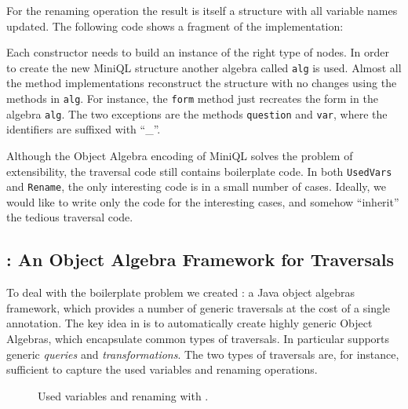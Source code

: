 For the renaming operation the result is itself a structure
with all variable names updated. The following code shows a fragment of the
implementation:


Each
constructor needs to build an instance of the right type of nodes.
In order to create the new
MiniQL structure another algebra called \lstinline{alg} is used.
Almost all the method implementations reconstruct the structure with
no changes using the methods in \lstinline{alg}. For instance, the \lstinline{form} method just recreates the form in the algebra \lstinline{alg}.  The two exceptions are the
methods \lstinline{question} and \lstinline{var}, where the identifiers are suffixed with ``\_''.

Although the Object Algebra encoding of MiniQL solves the problem of extensibility, the traversal code still contains boilerplate code.
In both \lstinline{UsedVars} and \lstinline{Rename}, the only interesting code
is in a small number of cases.  Ideally, we would like to write only
the code for the interesting cases, and somehow ``inherit'' the
tedious traversal code.

\subsection{\Name: An Object Algebra Framework for Traversals}

To deal with the boilerplate problem we created \Name: a Java object
algebras framework, which provides a number of generic traversals at
the cost of a single annotation. The key idea in \name is to
automatically create highly generic Object Algebras, which encapsulate
common types of traversals. In particular \name supports generic
\emph{queries} and \emph{transformations}. The two types of
traversals are, for instance,  sufficient to capture the used variables and
renaming operations.

\begin{figure}[t]
\nocaptionrule
\vspace{-.1in}
\caption{Used variables and renaming with \Name.}
\label{ql_with_oaframework}
\end{figure}

